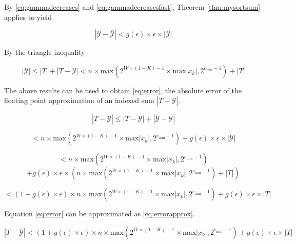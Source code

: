 \documentclass[12pt]{article}
\providecommand{\min}{\ensuremath{\text{min}}}
\providecommand{\max}{\ensuremath{\text{max}}}
\theoremstyle{definition}
\numberwithin{equation}{section}
\numberwithin{figure}{section}
\begin{document}
    By  \eqref{eq:gammadecreases} and \eqref{eq:gammadecreasesfast}, Theorem \ref{thm:mysortsum} applies to yield

    \begin{equation*}
      |\mathcal{Y} - \overline{\mathcal{Y}}| < g(\epsilon)\times\epsilon\times|\mathcal{Y}|
    \end{equation*}

    By the triangle inequality

    \begin{equation*}
      |\mathcal{Y}| \leq |T| + |T - \mathcal{Y}| < n \times \max(2^{W \times (1 - K) - 1} \times \max|x_k|, 2^{e_{\min} - 1}) + |T|
    \end{equation*}

    The above results can be used to obtain  \eqref{eq:error}, the absolute error of the floating point approximation of an indexed sum $|T - \overline{\mathcal{Y}}|$.

    \begin{equation*}
      |T - \overline{\mathcal{Y}}| \leq |T - \mathcal{Y}| + |\mathcal{Y} - \overline{\mathcal{Y}}|
    \end{equation*}

    \begin{equation*}
      < n \times \max(2^{W \times (1 - K) - 1} \times \max|x_k|, 2^{e_{\min} - 1}) + g(\epsilon)\times \epsilon\times |\mathcal{Y}|
    \end{equation*}

    \begin{equation*}
      < n \times \max(2^{W \times (1 - K) - 1} \times \max|x_k|, 2^{e_{\min} - 1})
    \end{equation*}
    \begin{equation*}
      + g(\epsilon)\times \epsilon\times (n \times \max(2^{W \times (1 - K) - 1} \times \max|x_k|, 2^{e_{\min} - 1}) + |T|)
    \end{equation*}

    \begin{equation}
      < (1 + g(\epsilon)\times\epsilon) \times n \times \max(2^{W \times (1 - K) - 1} \times \max|x_k|, 2^{e_{\min} - 1}) + g(\epsilon)\times\epsilon\times |T|
      \label{eq:error}
    \end{equation}

    Equation \eqref{eq:error} can be approximated as \eqref{eq:errorapprox}.

    \begin{equation*}
      |T - \overline{\mathcal{Y}}| < (1 + g(\epsilon)\times\epsilon) \times n \times \max(2^{W \times (1 - K) - 1} \times \max|x_k|, 2^{e_{\min} - 1}) + g(\epsilon)\times\epsilon\times|T|
    \end{equation*}
\end{document}
